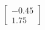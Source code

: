 \documentclass[preview]{standalone}
\begin{document}
\begin{align*}
\begin{bmatrix} -0.45 \\ 1.75 \end{bmatrix}
\end{align*}
\end{document}
